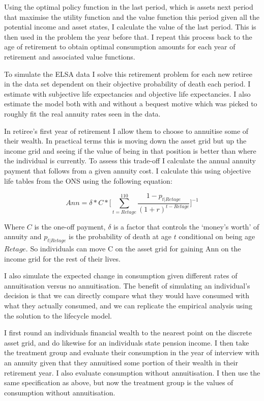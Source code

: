 \documentclass[12pt]{article}
\begin{document}
Using the optimal policy function in the last period, which is assets next period that maximise the utility
function and the value function this period given all the potential income and asset states, I calculate the value of the last period.
This is then used in the problem the year before that.
I repeat this process back to the age of retirement to obtain optimal consumption amounts for each year of retirement
and associated value functions.

To simulate the ELSA data I solve this retirement problem for each new retiree in the data set dependent on their
objective probability of death each period. I estimate with subjective life expectancies and objective life expectancies.
I also estimate the model both with and without a bequest motive which was picked to roughly fit the real annuity
rates seen in the data.

In retiree's first year of retirement I allow them to choose to annuitise some of their wealth. In practical terms
this is moving down the asset grid but up the income grid and seeing if the value of being in that position is better
than where the individual is currently. To assess this trade-off I calculate the annual annuity payment that follows
from a given annuity cost. I calculate this using objective life tables from the ONS using the following equation:

\begin{equation*}
    Ann = \delta * C * \biggl[\sum_{t = Retage}^{110}\frac{1 - p_{t|Retage}}{(1 + r)^{t - Retage}}\biggr]^{-1}
\end{equation*}

Where $C$ is the one-off payment, $\delta$ is a factor that controls the `money's worth' of annuity and $p_{t|Retage}$
is the probability of death at age $t$ conditional on being age $Retage$. So individuals can move C on the asset grid
for gaining Ann on the income grid for the rest of their lives.

I also simulate the expected change in consumption given different rates of annuitisation versus no annuitisation.
The benefit of simulating an individual's decision is that we can directly compare what they would have
consumed with what they actually consumed, and we can replicate the empirical analysis using the
solution to the lifecycle model.

I first round an individuals financial wealth to the nearest point on the discrete asset grid, and
do likewise for an individuals state pension income. I then take the treatment group and evaluate
their consumption in the year of interview with an annuity given that they annuitised some portion
of their wealth in their retirement year. I also evaluate consumption without annuitisation. I then
use the same specification as above, but now the treatment group is the values of consumption without
annuitisation.
\end{document}
